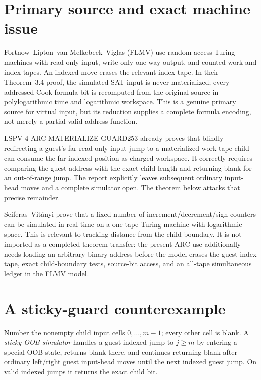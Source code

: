 \documentclass[11pt]{article}
\begin{document}
\section{Primary source and exact machine issue}
Fortnow--Lipton--van Melkebeek--Viglas (FLMV) use random-access Turing
machines with read-only input, write-only one-way output, and counted work and
index tapes.  An indexed move erases the relevant index tape.  In their
Theorem~3.4 proof, the simulated SAT input is never materialized; every
addressed Cook-formula bit is recomputed from the original source in
polylogarithmic time and logarithmic workspace.  This is a genuine primary
source for virtual input, but its reduction supplies a complete formula
encoding, not merely a partial valid-address function.

LSPV-4 ARC-MATERIALIZE-GUARD253 already proves that blindly redirecting a
guest's far read-only-input jump to a materialized work-tape child can consume
the far indexed position as charged workspace.  It correctly requires
comparing the guest address with the exact child length and returning blank for
an out-of-range jump.  The report explicitly leaves subsequent ordinary
input-head moves and a complete simulator open.  The theorem below attacks
that precise remainder.

Seiferas--Vit\'anyi prove that a fixed number of increment/decrement/sign
counters can be simulated in real time on a one-tape Turing machine with
logarithmic space.  This is relevant to tracking distance from the child
boundary.  It is not imported as a completed theorem transfer: the present
ARC use additionally needs loading an arbitrary binary address before the
model erases the guest index tape, exact child-boundary tests, source-bit
access, and an all-tape simultaneous ledger in the FLMV model.

\section{A sticky-guard counterexample}
Number the nonempty child input cells $0,\ldots,m-1$; every other cell is
blank.  A \emph{sticky-OOB simulator} handles a guest indexed jump to
$j\ge m$ by entering a special OOB state, returns blank there, and continues
returning blank after ordinary left/right guest input-head moves until the next
indexed guest jump.  On valid indexed jumps it returns the exact child bit.
\end{document}
